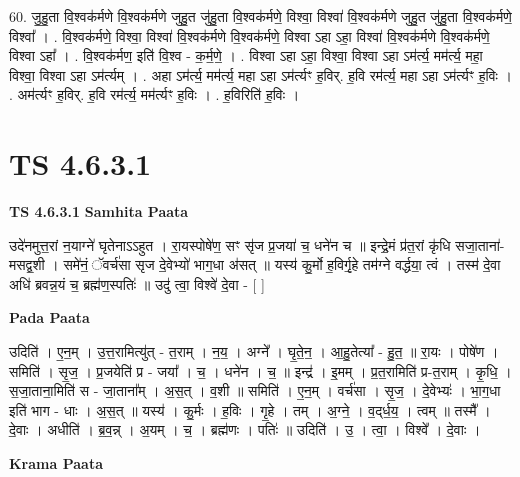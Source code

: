 \documentclass[17pt]{extarticle}
\begin{document}
60. जु॒हु॒ता वि॒श्वक॑र्मणे वि॒श्वक॑र्मणे जुहु॒त जु॑हु॒ता वि॒श्वक॑र्मणे॒ विश्वा॒ विश्वा॑ वि॒श्वक॑र्मणे जुहु॒त जु॑हु॒ता वि॒श्वक॑र्मणे॒ विश्वा᳚ । . वि॒श्वक॑र्मणे॒ विश्वा॒ विश्वा॑ वि॒श्वक॑र्मणे वि॒श्वक॑र्मणे॒ विश्वा ऽहा ऽहा॒ विश्वा॑ वि॒श्वक॑र्मणे वि॒श्वक॑र्मणे॒ विश्वा ऽहा᳚ । . वि॒श्वक॑र्मण॒ इति॑ वि॒श्व - क॒र्म॒णे॒ । . विश्वा ऽहा ऽहा॒ विश्वा॒ विश्वा ऽहा ऽम॑र्त्य॒ मम॑र्त्य॒ महा॒ विश्वा॒ विश्वा ऽहा ऽम॑र्त्यम् । . अहा ऽम॑र्त्य॒ मम॑र्त्य॒ महा ऽहा ऽम॑र्त्यꣳ ह॒विर्. ह॒वि रम॑र्त्य॒ महा ऽहा ऽम॑र्त्यꣳ ह॒विः । . अम॑र्त्यꣳ ह॒विर्. ह॒वि रम॑र्त्य॒ मम॑र्त्यꣳ ह॒विः । . ह॒विरिति॑ ह॒विः । \newline
\pagebreak
{}

\section{ TS 4.6.3.1 }

\textbf{TS 4.6.3.1 } \newline
\textbf{Samhita Paata} \newline

उदे॑नमुत्त॒रां न॒याग्ने॑ घृतेनाऽऽहुत । रा॒यस्पोषे॑ण॒ सꣳ सृ॑ज प्र॒जया॑ च॒ धने॑न च ॥ इन्द्रे॒मं प्र॑त॒रां कृ॑धि सजा॒ताना॑-मसद्व॒शी । समे॑नं॒ ॅवर्च॑सा सृज दे॒वेभ्यो॑ भाग॒धा अ॑सत् ॥ यस्य॑ कु॒र्मो ह॒विर्गृ॒हे तम॑ग्ने वर्द्धया॒ त्वं । तस्म॑ दे॒वा अधि॑ ब्रवन्न॒यं च॒ ब्रह्म॑ण॒स्पतिः॑ ॥ उदु॑ त्वा॒ विश्वे॑ दे॒वा - [  ] \newline

\textbf{Pada Paata} \newline

उदिति॑ । ए॒न॒म् । उ॒त्त॒रामित्यु॑त् - त॒राम् । न॒य॒ । अग्ने᳚ । घृ॒ते॒न॒ । आ॒हु॒तेत्या᳚ - हु॒त॒ ॥ रा॒यः । पोषे॑ण । समिति॑ । सृ॒ज॒ । प्र॒जयेति॑ प्र - जया᳚ । च॒ । धने॑न । च॒ ॥ इन्द्र॑ । इ॒मम् । प्र॒त॒रामिति॑ प्र-त॒राम् । कृ॒धि॒ । स॒जा॒ताना॒मिति॑ स - जा॒ताना᳚म् । अ॒स॒त् । व॒शी ॥ समिति॑ । ए॒न॒म् । वर्च॑सा । सृ॒ज॒ । दे॒वेभ्यः॑ । भा॒ग॒धा इति॑ भाग - धाः । अ॒स॒त् ॥ यस्य॑ । कु॒र्मः । ह॒विः । गृ॒हे । तम् । अ॒ग्ने॒ । व॒द्‌र्ध॒य॒ । त्वम् ॥ तस्मै᳚ । दे॒वाः । अधीति॑ । ब्र॒व॒न्न् । अ॒यम् । च॒ । ब्रह्म॑णः । पतिः॑ ॥ उदिति॑ । उ॒ । त्वा॒ । विश्वे᳚ । दे॒वाः ।  \newline


\textbf{Krama Paata} \newline
\end{document}
